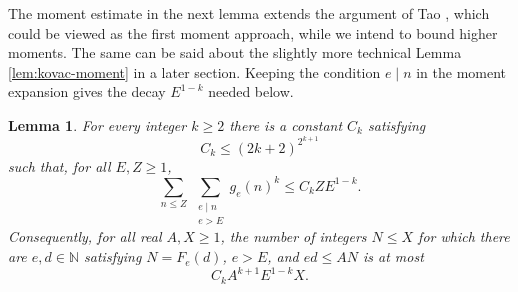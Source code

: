 \documentclass[11pt,letterpaper,reqno]{amsart}
\numberwithin{equation}{section}
\newtheorem{lemma}[theorem]{Lemma}
\theoremstyle{remark}
\newcommand{\N}{\mathbb{N}}
\renewcommand{\leq}{\leqslant}
\renewcommand{\geq}{\geqslant}
\begin{document}
The moment estimate in the next lemma extends the argument of Tao \cite{Bloom1054}, which could be viewed as the first moment approach, while we intend to bound higher moments.
The same can be said about the slightly more technical Lemma \ref{lem:kovac-moment} in a later section.
Keeping the condition $e\mid n$ in the moment expansion gives the decay $E^{1-k}$ needed below.

\begin{lemma}\label{lem:moment}
For every integer $k\geq2$ there is a constant $C_k$ satisfying
\begin{equation}\label{eq:Ck-growth}
 C_k\leq (2k+2)^{2^{k+1}}
\end{equation}
such that, for all $E,Z\geq1$,
\begin{equation}\label{eq:moment}
 \sum_{n\leq Z}\ \sum_{\substack{e\mid n\\e>E}}g_e(n)^k
 \leq C_kZE^{1-k}.
\end{equation}
Consequently, for all real $A,X\geq1$, the number of integers $N\leq X$
for which there are $e,d\in\N$ satisfying $N=F_e(d)$, $e>E$, and
$ed\leq AN$ is at most
\begin{equation}\label{eq:large-count}
 C_kA^{k+1}E^{1-k}X.
\end{equation}
\end{lemma}
\end{document}
